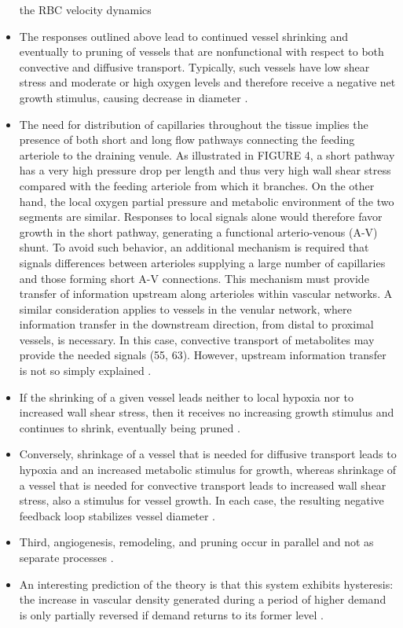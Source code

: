 \begin{itemize}
	the RBC velocity dynamics \cite{Carr2005}
	\item The responses outlined above lead to continued vessel shrinking and eventually to pruning of vessels that are nonfunctional with respect to both convective and diffusive transport. Typically, such vessels have low shear stress and moderate or high oxygen levels and therefore receive a negative net growth stimulus, causing decrease in diameter \cite{Pries2014}.
	\item The need for distribution of capillaries throughout the tissue implies the presence of both short and long flow pathways connecting the feeding arteriole to the draining venule. As illustrated in FIGURE 4, a short pathway has a very high pressure drop per length and thus very high wall shear stress compared with the feeding arteriole from which it branches. On the other hand, the local oxygen partial pressure and metabolic environment of the two segments are similar. Responses to local signals alone would therefore favor growth in the short pathway, generating a functional arterio-venous (A-V) shunt. To avoid such behavior, an additional mechanism is required that signals differences between arterioles supplying a large number of capillaries and those forming short A-V connections. This mechanism must provide transfer of information upstream along arterioles within vascular networks. A similar consideration applies to vessels in the venular network, where information transfer in the downstream direction, from distal to proximal vessels, is necessary. In this case, convective transport of metabolites may provide the needed signals (55, 63). However, upstream information transfer is not so simply explained \cite{Pries2014}.
	\item If the shrinking of a given vessel leads neither to local hypoxia nor to increased wall shear stress, then it receives no increasing growth stimulus and continues to shrink, eventually being pruned \cite{Pries2014}.
	\item Conversely, shrinkage of a vessel that is needed for diffusive transport leads to hypoxia and an increased metabolic stimulus for growth, whereas shrinkage of a vessel that is needed for convective transport leads to increased wall shear stress, also a stimulus for vessel growth. In each case, the resulting negative feedback loop stabilizes vessel diameter \cite{Pries2014}.
	\item Third, angiogenesis, remodeling, and pruning occur in parallel and not as separate processes \cite{Pries2014}.
	\item An interesting prediction of the theory is that this system exhibits hysteresis: the increase in vascular density generated during a period of higher demand is only partially reversed if demand returns to its former level \cite{Pries2014}.

\end{itemize}
